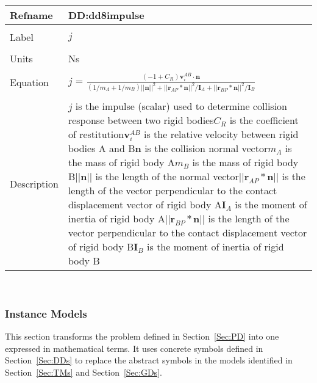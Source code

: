 \documentclass[12pt]{article}
\begin{document}
\noindent \begin{minipage}{\textwidth}
\begin{tabular}{p{} p{}}
\toprule \textbf{Refname} & \textbf{DD:dd8impulse}
\label{DD:dd8impulse}
\\ \midrule \\
Label & $j$
\\ \midrule \\
Units & Ns
\\ \midrule \\
Equation & $j$ = $\frac{(-1+C_{R})\mathbf{v}_{i}^{AB}\cdot{}\mathbf{n}}{(1/m_{A}+1/m_{B})||\mathbf{n}||^{2}+||\mathbf{r}_{AP}*\mathbf{n}||^{2}/\mathbf{I}_{A}+||\mathbf{r}_{BP}*\mathbf{n}||^{2}/\mathbf{I}_{B}}$
\\ \midrule \\
Description & $j$ is the impulse (scalar) used to determine collision response between two rigid bodies\newline$C_{R}$ is the coefficient of restitution\newline$\mathbf{v}_{i}^{AB}$ is the relative velocity between rigid bodies A and B\newline$\mathbf{n}$ is the collision normal vector\newline$m_{A}$ is the mass of rigid body A\newline$m_{B}$ is the mass of rigid body B\newline$||\mathbf{n}||$ is the length of the normal vector\newline$||\mathbf{r}_{AP}*\mathbf{n}||$ is the length of the vector perpendicular to the contact displacement vector of rigid body A\newline$\mathbf{I}_{A}$ is the moment of inertia of rigid body A\newline$||\mathbf{r}_{BP}*\mathbf{n}||$ is the length of the vector perpendicular to the contact displacement vector of rigid body B\newline$\mathbf{I}_{B}$ is the moment of inertia of rigid body B
\\ \bottomrule \end{tabular}
\end{minipage}\\
\subsubsection{Instance Models}
\label{Sec:IMs}
This section transforms the problem defined in Section~\ref{Sec:PD} into one expressed in mathematical terms. It uses concrete symbols defined in Section~\ref{Sec:DDs} to replace the abstract symbols in the models identified in Section~\ref{Sec:TMs} and Section~\ref{Sec:GDs}.
\end{document}
